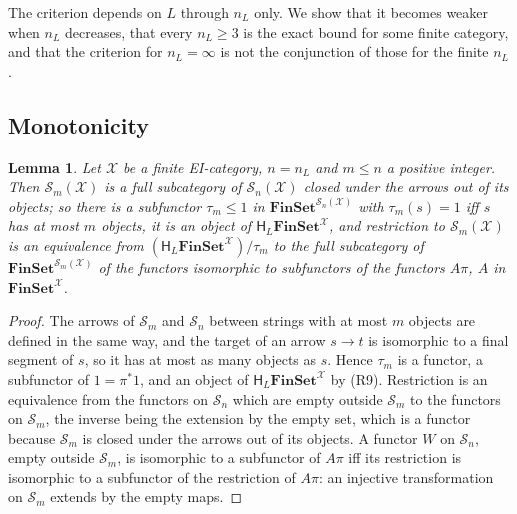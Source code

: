 \documentclass[11pt]{amsart}
\newtheorem{lem}[thm]{Lemma}
\theoremstyle{definition}
\newcommand{\Fin}{\mathbf{FinSet}}
\newcommand{\HH}{\mathsf H}
\newcommand{\cX}{\mathcal X}
\newcommand{\cS}{\mathcal S}
\begin{document}
The criterion depends on $L$ through $n_L$ only. We show that it
becomes weaker when $n_L$ decreases, that every $n_L\ge3$ is the exact
bound for some finite category, and that the criterion for
$n_L=\infty$ is not the conjunction of those for the finite $n_L$.

\subsection*{Monotonicity}

\begin{lem}\label{lem:slice}
Let $\cX$ be a finite EI-category, $n=n_L$ and $m\le n$ a positive
integer. Then $\cS_m(\cX)$ is a full subcategory of $\cS_n(\cX)$
closed under the arrows out of its objects; so there is a subfunctor
$\tau_m\le1$ in $\Fin^{\cS_n(\cX)}$ with $\tau_m(s)=1$ iff $s$ has at
most $m$ objects, it is an object of $\HH_L\Fin^\cX$, and restriction
to $\cS_m(\cX)$ is an equivalence from $(\HH_L\Fin^\cX)/\tau_m$ to the
full subcategory of $\Fin^{\cS_m(\cX)}$ of the functors isomorphic to
subfunctors of the functors $A\pi$, $A$ in $\Fin^\cX$.
\end{lem}
\begin{proof}
The arrows of $\cS_m$ and $\cS_n$ between strings with at most $m$
objects are defined in the same way, and the target of an arrow $s\to
t$ is isomorphic to a final segment of $s$, so it has at most as many
objects as $s$. Hence $\tau_m$ is a functor, a subfunctor of
$1=\pi^*1$, and an object of $\HH_L\Fin^\cX$ by (R9). Restriction is
an equivalence from the functors on $\cS_n$ which are empty outside
$\cS_m$ to the functors on $\cS_m$, the inverse being the extension by
the empty set, which is a functor because $\cS_m$ is closed under the
arrows out of its objects. A functor $W$ on $\cS_n$, empty outside
$\cS_m$, is isomorphic to a subfunctor of $A\pi$ iff its restriction
is isomorphic to a subfunctor of the restriction of $A\pi$: an
injective transformation on $\cS_m$ extends by the empty maps.
\end{proof}
\end{document}
